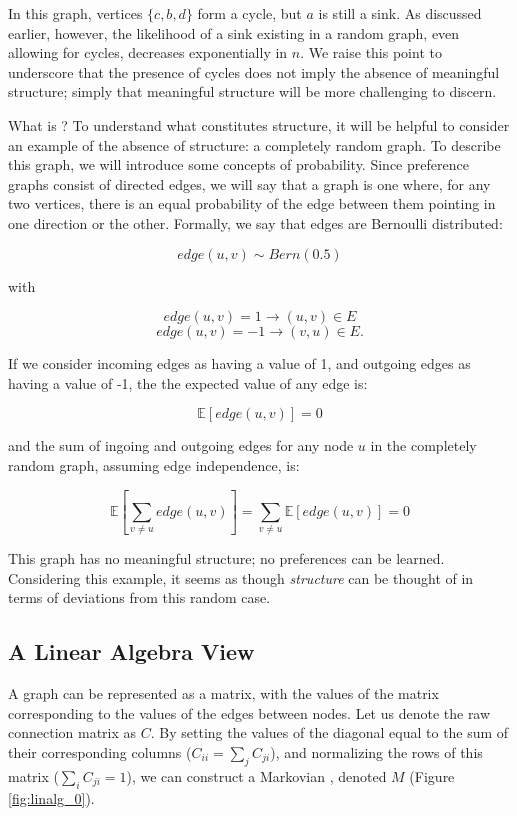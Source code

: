 In this graph, vertices $\{c, b, d\}$ form a cycle, but $a$ is still a sink.
As discussed earlier, however, the likelihood of a sink existing in a random graph, even allowing for cycles, decreases exponentially in $n$.
We raise this point to underscore that the presence of cycles does not imply the absence of meaningful structure; simply that meaningful structure will be more challenging to discern.

\bigskip

What is ?
To understand what constitutes structure, it will be helpful to consider an example of the absence of structure: a completely random graph.
To describe this graph, we will introduce some concepts of probability.
Since preference graphs consist of directed edges, we will say that a  graph is one where, for any two vertices, there is an equal probability of the edge between them pointing in one direction or the other.
Formally, we say that edges are Bernoulli distributed:

\[
edge(u,v) \sim Bern(0.5)
\]

with 

\[
edge(u,v) = 1 \rightarrow (u,v) \in E
\]
\[
edge(u,v) = -1 \rightarrow (v,u) \in E.
\]

If we consider incoming edges as having a value of 1, and outgoing edges as having a value of -1, the the expected value of any edge is:

\[
\mathbb{E}[edge(u,v)] = 0
\]

and the sum of ingoing and outgoing edges for any node $u$ in the completely random graph, assuming edge independence, is:

\[
\mathbb{E}\left[\sum_{v \neq u} edge(u,v)\right] = \sum_{v \neq u}\mathbb{E}[edge(u,v)] = 0
\]

This graph has no meaningful structure; no preferences can be learned.
Considering this example, it seems as though \textit{structure} can be thought of in terms of deviations from this random case.

\subsection{A Linear Algebra View}

A graph can be represented as a matrix, with the values of the matrix corresponding to the values of the edges between nodes.
Let us denote the raw connection matrix as $C$.
By setting the values of the diagonal equal to the sum of their corresponding columns ($C_{ii} = \sum_j C_{ji}$), and normalizing the rows of this matrix ($\sum_i C_{ji} = 1$), we can construct a Markovian , denoted $M$ (Figure \ref{fig:linalg_0}).

